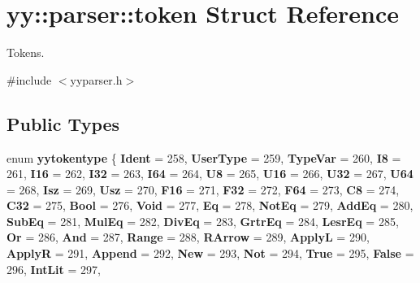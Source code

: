 \hypertarget{structyy_1_1parser_1_1token}{}\section{yy\+:\+:parser\+:\+:token Struct Reference}
\label{structyy_1_1parser_1_1token}


Tokens.  




{\ttfamily \#include $<$yyparser.\+h$>$}

\subsection*{Public Types}
\begin{DoxyCompactItemize}
\item 
\mbox{\label{structyy_1_1parser_1_1token_a90b63e7f9dd7177dd3bf01c58c408475}} 
enum {\bfseries yytokentype} \{ \newline
{\bfseries Ident} = 258, 
{\bfseries User\+Type} = 259, 
{\bfseries Type\+Var} = 260, 
{\bfseries I8} = 261, 
\newline
{\bfseries I16} = 262, 
{\bfseries I32} = 263, 
{\bfseries I64} = 264, 
{\bfseries U8} = 265, 
\newline
{\bfseries U16} = 266, 
{\bfseries U32} = 267, 
{\bfseries U64} = 268, 
{\bfseries Isz} = 269, 
\newline
{\bfseries Usz} = 270, 
{\bfseries F16} = 271, 
{\bfseries F32} = 272, 
{\bfseries F64} = 273, 
\newline
{\bfseries C8} = 274, 
{\bfseries C32} = 275, 
{\bfseries Bool} = 276, 
{\bfseries Void} = 277, 
\newline
{\bfseries Eq} = 278, 
{\bfseries Not\+Eq} = 279, 
{\bfseries Add\+Eq} = 280, 
{\bfseries Sub\+Eq} = 281, 
\newline
{\bfseries Mul\+Eq} = 282, 
{\bfseries Div\+Eq} = 283, 
{\bfseries Grtr\+Eq} = 284, 
{\bfseries Lesr\+Eq} = 285, 
\newline
{\bfseries Or} = 286, 
{\bfseries And} = 287, 
{\bfseries Range} = 288, 
{\bfseries R\+Arrow} = 289, 
\newline
{\bfseries ApplyL} = 290, 
{\bfseries ApplyR} = 291, 
{\bfseries Append} = 292, 
{\bfseries New} = 293, 
\newline
{\bfseries Not} = 294, 
{\bfseries True} = 295, 
{\bfseries False} = 296, 
{\bfseries Int\+Lit} = 297, 
\newline

\end{DoxyCompactItemize}
